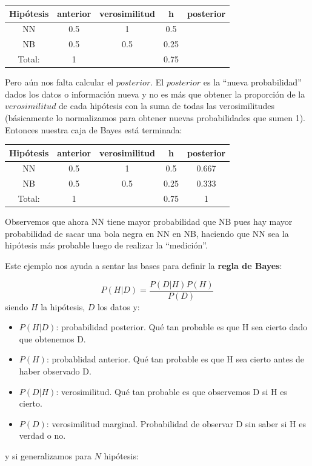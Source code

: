 \documentclass{article}
\begin{document}
\begin{center}
\begin{tabular}{ |c|c|c|c|c| } 
\hline
Hip\'otesis & anterior & verosimilitud &  h  & posterior \\
\hline
NN & 0.5 & 1   & 0.5  & \\
NB & 0.5 & 0.5 & 0.25 & \\
\hline
Total: & 1 &  & 0.75  & \\
\hline
\end{tabular}
\end{center}
Pero a\'un nos falta calcular el $posterior$. El $posterior$ es la ``nueva probabilidad'' dados los datos o informaci\'on nueva y no es m\'as que obtener la proporci\'on de la $verosimilitud$ de cada hip\'otesis con la suma de todas las verosimilitudes (b\'asicamente lo normalizamos para obtener nuevas probabilidades que sumen 1). Entonces nuestra caja de Bayes est\'a terminada:

\begin{center}
\begin{tabular}{ |c|c|c|c|c| } 
\hline
Hip\'otesis & anterior & verosimilitud &  h  & posterior \\
\hline
NN & 0.5 & 1 & 0.5 & 0.667 \\
NB & 0.5 & 0.5 & 0.25 & 0.333 \\
\hline
Total: & 1 &  & 0.75 & 1 \\
\hline
\end{tabular}
\end{center}
Observemos que ahora NN tiene mayor probabilidad que NB pues hay mayor probabilidad de sacar una bola negra en NN en NB, haciendo que NN sea la hip\'otesis m\'as probable luego de realizar la ``medici\'on''.

Este ejemplo nos ayuda a sentar las bases para definir la \textbf{regla de Bayes}:

\begin{equation}
P(H\vert D)=\frac{P(D\vert H)P(H)}{P(D)}
\end{equation}
siendo $H$ la hip\'otesis, $D$ los datos y:

\begin{itemize}
\item $P(H\vert D)$: probabilidad posterior. Qu\'e tan probable es que H sea cierto dado que obtenemos D. 
\item $P(H)$: probablidad anterior. Qu\'e tan probable es que H sea cierto antes de haber observado D.
\item $P(D\vert H)$: verosimilitud. Qu\'e tan probable es que observemos D si H es cierto.
\item $P(D)$: verosimilitud marginal. Probabilidad de observar D sin saber si H es verdad o no.
\end{itemize}
y si generalizamos para $N$ hip\'otesis:
\end{document}
